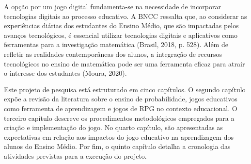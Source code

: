 A opção por um jogo digital fundamenta-se na necessidade de incorporar tecnologias digitais ao processo educativo. A BNCC ressalta que, ao considerar as experiências diárias dos estudantes do Ensino Médio, que são impactadas pelos avanços tecnológicos, é essencial utilizar tecnologias digitais e aplicativos como ferramentas para a investigação matemática (Brasil, 2018, p. 528). Além de refletir as realidades contemporâneas dos alunos, a integração de recursos tecnológicos no ensino de matemática pode ser uma ferramenta eficaz para atrair o interesse dos estudantes (Moura, 2020).

Este projeto de pesquisa está estruturado em cinco capítulos. O segundo capítulo expõe a revisão da literatura sobre o ensino de probabilidade, jogos educativos como ferramenta de aprendizagem e jogos de RPG no contexto educacional. O terceiro capítulo descreve os procedimentos metodológicos empregados para a criação e implementação do jogo. No quarto capítulo, são apresentadas as expectativas em relação aos impactos do jogo educativo na aprendizagem dos alunos do Ensino Médio. Por fim, o quinto capítulo detalha a cronologia das atividades previstas para a execução do projeto.
